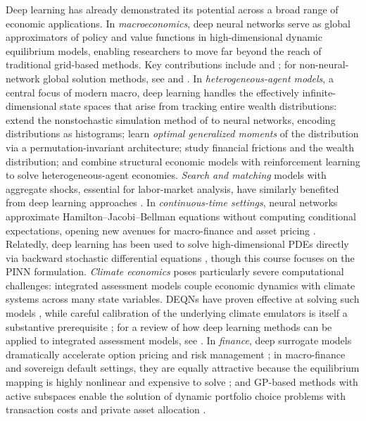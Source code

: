 \documentclass[11pt,a4paper]{report}
\begin{document}
Deep learning has already demonstrated its potential across a broad range of economic applications.
%
In \emph{macroeconomics}, deep neural networks serve as global approximators of policy and value functions in high-dimensional dynamic equilibrium models, enabling researchers to move far beyond the reach of traditional grid-based methods.  Key contributions include \citet{maliar2021deep} and \citet{azinovicDEEPEQUILIBRIUMNETS2022}; for non-neural-network global solution methods, see \citet{ECTA:ECTA1716} and \citet{eftekhari2025dynare}.
%
In \emph{heterogeneous-agent models}, a central focus of modern macro, deep learning handles the effectively infinite-dimensional state spaces that arise from tracking entire wealth distributions: \citet{azinovicDEEPEQUILIBRIUMNETS2022} extend the nonstochastic simulation method of \citet{young2010} to neural networks, encoding distributions as histograms; \citet{han2023deepham} learn \emph{optimal generalized moments} of the distribution via a permutation-invariant architecture; \citet{fernandezvillaverde2023hjb} study financial frictions and the wealth distribution; and \citet{yang2025structural} combine structural economic models with reinforcement learning to solve heterogeneous-agent economies.
%
\emph{Search and matching} models with aggregate shocks, essential for labor-market analysis, have similarly benefited from deep learning approaches \citep{payne2024deepsam}.
%
In \emph{continuous-time settings}, neural networks approximate Hamilton--Jacobi--Bellman equations without computing conditional expectations, opening new avenues for macro-finance and asset pricing \citep{gopalakrishna2024aliens, duarte2024ml}.  Relatedly, deep learning has been used to solve high-dimensional PDEs directly via backward stochastic differential equations \citep{han2018solving}, though this course focuses on the PINN formulation.
%
\emph{Climate economics} poses particularly severe computational challenges: integrated assessment models couple economic dynamics with climate systems across many state variables.  DEQNs have proven effective at solving such models \citep{kubler2025using}, while careful calibration of the underlying climate emulators is itself a substantive prerequisite \citep{Folini_2021}; for a review of how deep learning methods can be applied to integrated assessment models, see \citet{fernandezvillaverde2025climate}.
%
In \emph{finance}, deep surrogate models dramatically accelerate option pricing and risk management \citep{hutchinson1994nonparametric, scheideggertreccani_2018, chen2025Deep}; in macro-finance and sovereign default settings, they are equally attractive because the equilibrium mapping is highly nonlinear and expensive to solve \citep{arellano2008default}; and GP-based methods with active subspaces enable the solution of dynamic portfolio choice problems with transaction costs \citep{gaegauf2023portfolio} and private asset allocation \citep{chen2025private}.
\end{document}
